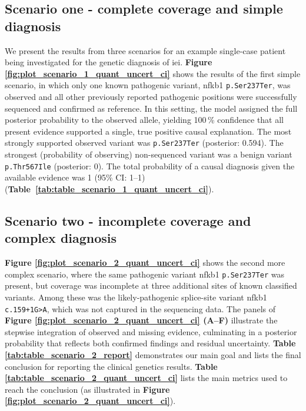 \subsection{Scenario one - complete coverage and simple diagnosis}
We present the results from three scenarios for an example single-case patient being investigated for the genetic diagnosis of \ac{iei}.
\textbf{Figure \ref{fig:plot_scenario_1_quant_uncert_ci}} shows the results of the first simple scenario, in which only one known pathogenic variant, \ac{nfkb1} \texttt{p.Ser237Ter}, was observed and all other previously reported pathogenic positions were successfully sequenced and confirmed as reference. 
In this setting, the model assigned the full posterior probability to the observed allele, yielding 100\,\% confidence that all present evidence supported a single, true positive causal explanation. 
The most strongly supported observed variant was \texttt{p.Ser237Ter} (posterior: 0.594). 
The strongest (probability of observing) non-sequenced variant was a benign variant \texttt{p.Thr567Ile} (posterior: 0). 
The total probability of a causal diagnosis given the available evidence was 1 (95\% CI: 1--1) (\textbf{Table~\ref{tab:table_scenario_1_quant_uncert_ci}}). 

\subsection{Scenario two - incomplete coverage and complex diagnosis}

\textbf{Figure \ref{fig:plot_scenario_2_quant_uncert_ci}} shows the second more complex scenario, where the same pathogenic variant \ac{nfkb1} \texttt{p.Ser237Ter} was present, but coverage was incomplete at three additional sites of known classified variants. 
Among these was the likely-pathogenic splice-site variant \ac{nfkb1} \texttt{c.159+1G{\small\textgreater}A}, which was not captured in the sequencing data. 
The panels of \textbf{Figure \ref{fig:plot_scenario_2_quant_uncert_ci} (A–F)} illustrate the stepwise integration of observed and missing evidence, culminating in a posterior probability that reflects both confirmed findings and residual uncertainty.
\textbf{Table \ref{tab:table_scenario_2_report}} demonstrates our main goal and lists the final conclusion for reporting the clinical genetics results.
\textbf{Table \ref{tab:table_scenario_2_quant_uncert_ci}} lists the main metrics used to reach the conclusion (as illustrated in 
\textbf{Figure \ref{fig:plot_scenario_2_quant_uncert_ci}}).

